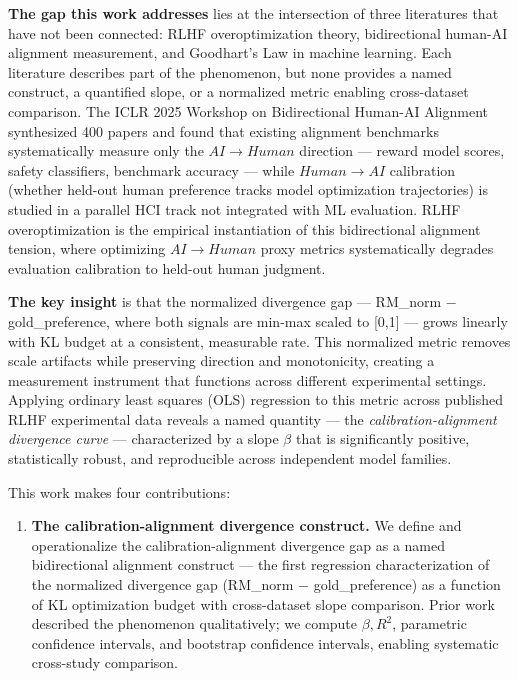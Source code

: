\textbf{The gap this work addresses} lies at the intersection of three literatures that have not been connected: RLHF overoptimization theory, bidirectional human-AI alignment measurement, and Goodhart's Law in machine learning. Each literature describes part of the phenomenon, but none provides a named construct, a quantified slope, or a normalized metric enabling cross-dataset comparison. The ICLR 2025 Workshop on Bidirectional Human-AI Alignment synthesized 400 papers and found that existing alignment benchmarks systematically measure only the $AI\rightarrow Human$ direction --- reward model scores, safety classifiers, benchmark accuracy --- while $Human\rightarrow AI$ calibration (whether held-out human preference tracks model optimization trajectories) is studied in a parallel HCI track not integrated with ML evaluation. RLHF overoptimization is the empirical instantiation of this bidirectional alignment tension, where optimizing $AI\rightarrow Human$ proxy metrics systematically degrades evaluation calibration to held-out human judgment.

\textbf{The key insight} is that the normalized divergence gap --- RM\_norm $-$ gold\_preference, where both signals are min-max scaled to [0,1] --- grows linearly with KL budget at a consistent, measurable rate. This normalized metric removes scale artifacts while preserving direction and monotonicity, creating a measurement instrument that functions across different experimental settings. Applying ordinary least squares (OLS) regression to this metric across published RLHF experimental data reveals a named quantity --- the \textit{calibration-alignment divergence curve} --- characterized by a slope $\beta$ that is significantly positive, statistically robust, and reproducible across independent model families.

This work makes four contributions:

\begin{enumerate}
\item \textbf{The calibration-alignment divergence construct.} We define and operationalize the calibration-alignment divergence gap as a named bidirectional alignment construct --- the first regression characterization of the normalized divergence gap (RM\_norm $-$ gold\_preference) as a function of KL optimization budget with cross-dataset slope comparison. Prior work described the phenomenon qualitatively; we compute $\beta, R^2$, parametric confidence intervals, and bootstrap confidence intervals, enabling systematic cross-study comparison.
\end{enumerate}

